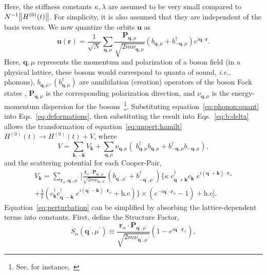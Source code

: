 \documentclass[preprint,5p,times,twocolumn]{elsarticle}
\newcommand{\bmk}{\bm{k}}
\newcommand{\bmq}{\bm{q}}
\newcommand{\bmr}{\bm{r}}
\newcommand{\bmu}{\bm{u}}
\begin{document}
Here, the stiffness constants $\kappa,\lambda$ are assumed to be very small compared to $N^{-1}\norm{H^{(0)}(t)}$. For simplicity, it is also assumed that they are independent of the basis vectors. We now quantize the orbits $\bmu$ as
\begin{equation}
    \bmu(\bmr) = \frac{1}{\sqrt{N}}\sum_{\bmq,\mu}\frac{\bm{P}_{\bmq,\mu}}{\sqrt{2m\nu_{\bmq,\mu}}}\left(b_{\bmq,\mu} + b^\dagger_{-\bmq,\mu}\right)e^{i\bmq\cdot\bmr}.
    \label{eq:phonon:quant}
\end{equation}
Here, $\bmq,\mu$ represents the momentum and polarization of a boson field (in a physical lattice, these bosons would correspond to quanta of sound, \textit{i.e.}, phonons), $b_{\bmq, \mu}, (b^\dagger_{\bmq, \mu})$ are annihilation (creation) operators of the boson Fock states , $\bm{P}_{\bmq,\mu}$ is the corresponding polarization direction, and $\nu_{\bmq,\mu}$ is the energy-momentum dispersion for the bosons~\footnote{See, for instance,~\citep{marder:ch13}}. Substituting equation~\ref{eq:phonon:quant} into Eqs.~\ref{eq:deformations}, then substituting the result into Eqs.~\ref{eq:b:delta} allows the transformation of equation~\ref{eq:unpert:hamilt}  $H^{(0)}(t)\rightarrow H^{(0)}(t) + V$, where
\begin{equation}
    V= \sum_{\bmk, -\bmk}V_{\bmk} + \sum_{\bmq,\mu}\nu_{\bmq, \mu}\left( \;b^\dagger_{\bmq, \mu} b^{\;}_{\bmq, \mu} +  b^\dagger_{-\bmq, \mu}b^{\;}_{-\bmq, \mu}\right),
\end{equation}
and the scattering potential for each Cooper-Pair, 
\begin{multline}
    V_{\bmk} = \sum_{\bmr_\alpha, \bm{q^\prime},\mu^\prime}\Bigg[\frac{\bmr_\alpha\cdot\bm{P}_{\bm{q^\prime},\mu^\prime}}{\sqrt{2m\nu_{\bm{q^\prime},\mu^\prime}}}\left(b_{\bm{q^\prime},\mu^\prime} + b^\dagger_{-\bm{q^\prime},\mu^\prime}\right)   \Big\{ \kappa\;c^\dagger_{\bm{q^\prime}+\bmk}c^{\;}_{\bmk}\;e^{i\left(\bm{q^\prime}+\bmk\right)\cdot\bmr_\alpha}  \\
    + \frac{\lambda}{2}\left( c^\dagger_{\bmk}c^\dagger_{\bm{q^\prime}-\bmk}\;e^{i\left(\bm{q^\prime}-\bmk\right)\cdot\bmr_\alpha}+\mathrm{h.c}\right) \Big\} \times \left(e^{-i\bm{q^\prime}\cdot\bmr_\alpha}-1\right) + \mathrm{h.c}\Bigg].
    \label{eq:perturbation}
\end{multline}
Equation~\ref{eq:perturbation} can be simplified by absorbing the lattice-dependent terms into constants. First, define the Structure Factor,
\begin{equation}
    S_\alpha(\bmq^\prime,\mu^\prime)\equiv\frac{\bmr_\alpha\cdot \bm{P}_{\bmq^\prime,\mu^\prime}}{\sqrt{2m\nu_{\bmq^\prime,\mu^\prime}}}\left(1-e^{i\bmq^\prime\cdot \bmr_\alpha}\right),
    \label{eq:sfactor}
\end{equation}
\end{document}
